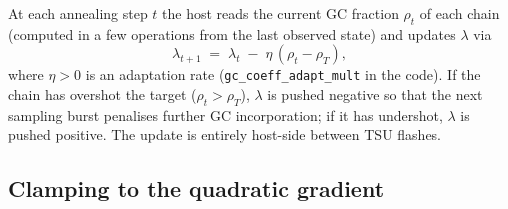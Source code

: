 \documentclass[11pt]{article}
\begin{document}
At each annealing step $t$ the host reads the current GC fraction $\rho_t$ of each chain (computed in a few operations from the last observed state) and updates $\lambda$ via
\begin{equation}\label{eq:lambda-update}
  \lambda_{t+1} \;=\; \lambda_t \;-\; \eta\,(\rho_t - \rho_T),
\end{equation}
where $\eta > 0$ is an adaptation rate (\texttt{gc\_coeff\_adapt\_mult} in the code).
If the chain has overshot the target ($\rho_t > \rho_T$), $\lambda$ is pushed negative so that the next sampling burst penalises further GC incorporation; if it has undershot, $\lambda$ is pushed positive.
The update is entirely host-side between TSU flashes.

\subsection*{Clamping to the quadratic gradient}
\end{document}
